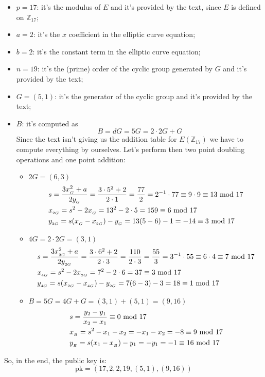 \begin{itemize}
    \item $p=17$: it's the modulus of $E$ and it's provided by the text, since $E$ is defined on $\mathbb{Z}_{17}$;
    \item $a=2$: it's the $x$ coefficient in the elliptic curve equation;
    \item $b=2$: it's the constant term in the elliptic curve equation;
    \item $n=19$: it's the (prime) order of the cyclic group generated by $G$ and it's provided by the text;
    \item $G=(5,1)$: it's the generator of the cyclic group and it's provided by the text;
    \item $B$: it's computed as
    $$B=dG=5G=2\cdot2G+G$$
    Since the text isn't giving us the addition table for $E(\mathbb{Z}_{17})$ we have to compute everything by ourselves. Let's perform then two point doubling operations and one point addition:
    \begin{itemize}
        \item $2G=(6,3)$
        \begin{align*}
            &s=\dfrac{3x_{_G}^2+a}{2y_{_G}}=\dfrac{3\cdot5^2+2}{2\cdot1}=\dfrac{77}{2}=2^{-1}\cdot 77\equiv 9\cdot9\equiv13\text{ mod }17\\
            &x_{_{2G}}=s^2-2x_{_G}=13^2-2\cdot5=159\equiv6\text{ mod }17\\
            &y_{_{2G}}=s(x_{_G}-x_{_{2G}})-y_{_{G}}=13(5-6)-1=-14\equiv3\text{ mod }17
        \end{align*}
        \item $4G=2\cdot2G=(3,1)$
        \begin{align*}
            &s=\dfrac{3x_{_{2G}}^2+a}{2y_{_{2G}}}=\dfrac{3\cdot6^2+2}{2\cdot3}=\dfrac{110}{2\cdot3}=\dfrac{55}{3}=3^{-1}\cdot55\equiv6\cdot4\equiv7\text{ mod }17\\
            &x_{_{4G}}=s^2-2x_{_{2G}}=7^2-2\cdot6=37\equiv3\text{ mod }17\\
            &y_{_{4G}}=s(x_{_{2G}}-x_{_{4G}})-y_{_{2G}}=7(6-3)-3=18\equiv1\text{ mod }17
        \end{align*}
        \item $B=5G=4G+G=(3,1)+(5,1)=(9,16)$
        \begin{align*}
            &s=\dfrac{y_2-y_1}{x_2-x_1}\equiv0\text{ mod }17\\
            &x_{_B}=s^2-x_1-x_2=-x_1-x_2=-8\equiv9\text{ mod }17\\
            &y_{_B}=s(x_1-x_{_B})-y_1=-y_1=-1\equiv16\text{ mod }17
        \end{align*}
    \end{itemize}
\end{itemize}
So, in the end, the public key is:
$$\text{pk}=(17,2,2,19,(5,1),(9,16))$$

